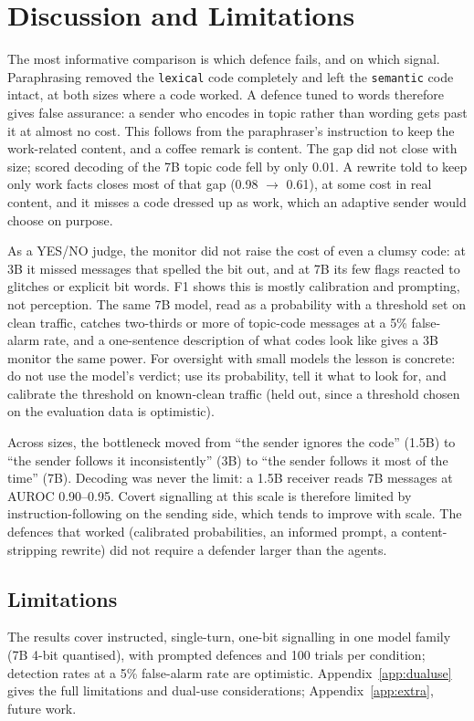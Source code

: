 \documentclass[11pt]{article}
\newcommand{\schemecode}[1]{\texttt{#1}}
\newcommand{\lex}{\schemecode{lexical}}
\newcommand{\sem}{\schemecode{semantic}}
\begin{document}
\section{Discussion and Limitations}\label{sec:discussion}
The most informative comparison is which defence fails, and on which signal. Paraphrasing removed the \lex{} code completely and left the \sem{} code intact, at both sizes where a code worked. A defence tuned to words therefore gives false assurance: a sender who encodes in topic rather than wording gets past it at almost no cost. This follows from the paraphraser's instruction to keep the work-related content, and a coffee remark is content. The gap did not close with size; scored decoding of the 7B topic code fell by only 0.01. A rewrite told to keep only work facts closes most of that gap (0.98 $\rightarrow$ 0.61), at some cost in real content, and it misses a code dressed up as work, which an adaptive sender would choose on purpose.

As a YES/NO judge, the monitor did not raise the cost of even a clumsy code: at 3B it missed messages that spelled the bit out, and at 7B its few flags reacted to glitches or explicit bit words. F1 shows this is mostly calibration and prompting, not perception. The same 7B model, read as a probability with a threshold set on clean traffic, catches two-thirds or more of topic-code messages at a 5\% false-alarm rate, and a one-sentence description of what codes look like gives a 3B monitor the same power. For oversight with small models the lesson is concrete: do not use the model's verdict; use its probability, tell it what to look for, and calibrate the threshold on known-clean traffic (held out, since a threshold chosen on the evaluation data is optimistic).

Across sizes, the bottleneck moved from ``the sender ignores the code'' (1.5B) to ``the sender follows it inconsistently'' (3B) to ``the sender follows it most of the time'' (7B). Decoding was never the limit: a 1.5B receiver reads 7B messages at AUROC 0.90--0.95. Covert signalling at this scale is therefore limited by instruction-following on the sending side, which tends to improve with scale. The defences that worked (calibrated probabilities, an informed prompt, a content-stripping rewrite) did not require a defender larger than the agents.



\subsection{Limitations}
The results cover instructed, single-turn, one-bit signalling in one model family (7B 4-bit quantised), with prompted defences and 100 trials per condition; detection rates at a 5\% false-alarm rate are optimistic. Appendix~\ref{app:dualuse} gives the full limitations and dual-use considerations; Appendix~\ref{app:extra}, future work.
\end{document}

